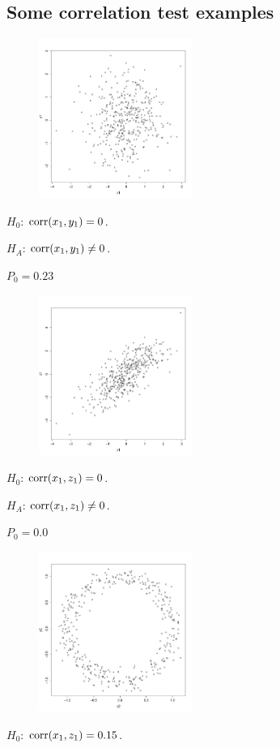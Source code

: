 \subsection*{Some correlation test examples}
\clearpage
\begin{figure}
  \begin{center}
    \includegraphics[width=5cm]{x1_vs_y1.pdf}
  \end{center}
\end{figure}
$H_0$: $\operatorname*{corr}(x_1, y_1)=0$.

$H_A$: $\operatorname*{corr}(x_1, y_1)\ne0$.

$P_0 = 0.23$

\clearpage
\begin{figure}
  \begin{center}
    \includegraphics[width=5cm]{x1_vs_z1.pdf}
  \end{center}
\end{figure}
$H_0$: $\operatorname*{corr}(x_1, z_1)=0$.

$H_A$: $\operatorname*{corr}(x_1, z_1)\ne0$.

$P_0 = 0.0$
\clearpage
\begin{figure}
  \begin{center}
    \includegraphics[width=5cm]{x2_vs_y2.pdf}
  \end{center}
\end{figure}
$H_0$: $\operatorname*{corr}(x_1, z_1)=0.15$.

